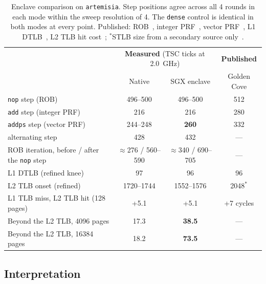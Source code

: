 \documentclass[11pt]{article}
\begin{document}
\begin{table}[H]
\centering
\small
\begin{tabular}{lcc|c}
\toprule
 & \multicolumn{2}{c|}{\textbf{Measured} (TSC ticks at 2.0~GHz)} & \textbf{Published} \\
 & Native & SGX enclave & Golden Cove \\
\midrule
\texttt{nop} step (ROB) & 496--500 & 496--500 & 512 \\
\texttt{add} step (integer PRF) & 216 & 216 & 280 \\
\texttt{addps} step (vector PRF) & 244--248 & \textbf{260} & 332 \\
alternating step & 428 & 432 & --- \\
ROB iteration, before / after the \texttt{nop} step & $\approx$276 / 560--590 & $\approx$340 / 690--705 & --- \\
L1 DTLB (refined knee) & 97 & 96 & 96 \\
L2 TLB onset (refined) & 1720--1744 & 1552--1576 & 2048$^\ast$ \\
L1 TLB miss, L2 TLB hit (128 pages) & +5.1 & +5.1 & +7 cycles \\
Beyond the L2 TLB, 4096 pages & 17.3 & \textbf{38.5} & --- \\
Beyond the L2 TLB, 16384 pages & 18.2 & \textbf{73.5} & --- \\
\bottomrule
\end{tabular}
\caption{Enclave comparison on \texttt{artemisia}. Step positions agree
across all 4 rounds in each mode within the sweep resolution of 4. The \texttt{dense} control is identical in
both modes at every point. Published: ROB~\cite{toms-gc,cnc-gc}, integer
PRF~\cite{cnc-spr-vrf}, vector PRF~\cite{wp-gc}, L1 DTLB~\cite{toms-gc},
L2 TLB hit cost~\cite{cnc-spr}; $^\ast$STLB size from a secondary
source only~\cite{blog-stlb}.}
\label{tab:enclave}
\end{table}

\subsection{Interpretation}
\end{document}
